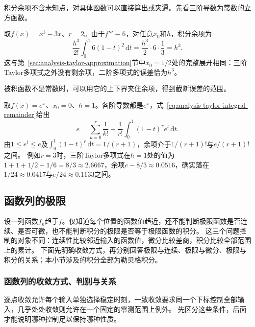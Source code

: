 积分余项不含未知点，对具体函数可以直接算出或夹逼。先看三阶导数为常数的立方函数。
\begin{example}[立方函数的积分余项]
取$f(x)=x^3-3x$、$r=2$。由于$f'''\equiv6$，对任意$x_0$和$h$，积分余项为
\[
 \frac{h^3}{2!}\int_0^1 6(1-t)^2\,\mathrm dt=\frac{h^3}{2}\cdot6\cdot\frac13=h^3.
\]
这与第~\ref{sec:analysis-taylor-approximation}节中$x_0=1/2$处的完整展开相同：三阶Taylor多项式之外没有剩余项，二阶多项式的误差恰为$h^3$。
\end{example}

被积函数不是常数时，可以用它的上下界夹住余项，得到截断误差的范围。
\begin{example}[用积分余项估计$e$]
取$f(x)=e^x$、$x_0=0$、$h=1$。各阶导数都是$e^x$，式~\eqref{eq:analysis-taylor-integral-remainder}给出
\[
 e=\sum_{k=0}^r\frac1{k!}+\frac1{r!}\int_0^1(1-t)^re^t\,\mathrm dt.
\]
由$1\leq e^t\leq e$及$\int_0^1(1-t)^r\,\mathrm dt=1/(r+1)$，余项介于$1/(r+1)!$与$e/(r+1)!$之间。
例如$r=3$时，三阶Taylor多项式在$h=1$处的值为$1+1+1/2+1/6=8/3\approx2.6667$，余项$e-8/3\approx0.0516$，确实落在$1/24\approx0.0417$与$e/24\approx0.1133$之间。
\end{example}



\subsection{函数列的极限}
\label{sec:measurable-convergence-and-integrals}
\label{sec:analysis-limit-integral-interchange}
\label{sec:analysis-function-convergence-essential-bounds}

设一列函数$f_n$趋于$f$。仅知道每个位置的函数值趋近，还不能判断极限函数是否连续、是否可微，也不能判断积分的极限是否等于极限函数的积分。
这三个问题控制的对象不同：连续性比较邻近输入的函数值，微分比较差商，积分比较全部范围上的累计。
下面先明确收敛方式，再分别回答极限与连续、极限与微分、极限与积分的关系；本小节涉及的积分全部为勒贝格积分。

\subsubsection{函数列的收敛方式、判别与关系}
\label{sec:analysis-convergence-mode-relations}

逐点收敛允许每个输入单独选择稳定时刻，一致收敛要求同一个下标控制全部输入，几乎处处收敛则允许在一个固定的零测范围上例外。
先区分这些条件，后面才能说明哪种控制足以保持哪种性质。

